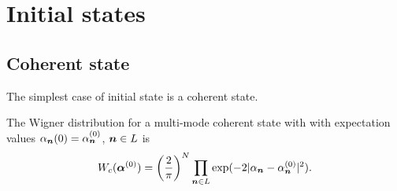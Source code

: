 \section{Initial states}

\subsection{Coherent state}

The simplest case of initial state is a coherent state.

\begin{lemma}
The Wigner distribution for a multi-mode coherent state with with expectation values
$\alpha_{\boldsymbol{n}}(0) = \alpha_{\boldsymbol{n}}^{(0)}$, $\boldsymbol{n} \in L$ is
\[
	W_c (\bm{\alpha}^{(0)})
	= \left( \frac{2}{\pi} \right)^N \prod_{\boldsymbol{n} \in L}
		\exp(-2 |\alpha_{\boldsymbol{n}} - \alpha_{\boldsymbol{n}}^{(0)}|^2).
\]
\end{lemma}
